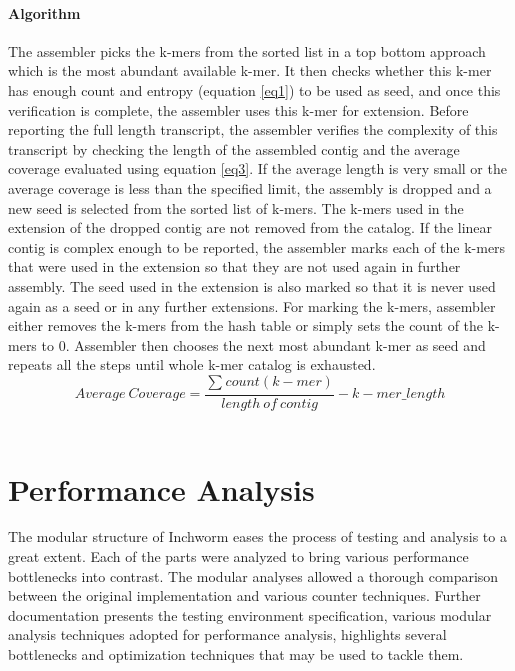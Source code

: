\label{key}\documentclass[plainarticle, english ,zihtitle,final,hyperref,utf8]{zihpub}
\begin{document}
\paragraph{Algorithm} The assembler picks the k-mers from the sorted list in a top bottom approach which is the most abundant available k-mer. It then checks whether this k-mer has enough count and entropy (equation \ref{eq1}) to be used as seed, and once this verification is complete, the assembler uses this k-mer for extension. Before reporting the full length transcript, the assembler verifies the complexity of this transcript by checking the length of the assembled contig and the average coverage evaluated using equation \ref{eq3}. If the average length is very small or the average coverage is less than the specified limit, the assembly is dropped and a new seed is selected from the sorted list of k-mers. The k-mers used in the extension of the dropped contig are not removed from the catalog. If the linear contig is complex enough to be reported, the assembler marks each of the k-mers that were used in the extension so that they are not used again in further assembly. The seed used in the extension is also marked so that it is never used again as a seed or in any further extensions. For marking the k-mers, assembler either removes the k-mers from the hash table or simply sets the count of the k-mers to 0. Assembler then chooses the next most abundant k-mer as seed and repeats all the steps until whole k-mer catalog is exhausted.
\begin{equation}
Average\ Coverage = \frac{\sum_{} count (k-mer)}{length\ of\ contig} - k-mer\_length
\label{eq3}
\end{equation}
\\
\section{Performance Analysis}
The modular structure of Inchworm eases the process of testing and analysis to a great extent. Each of the parts were analyzed to bring various performance bottlenecks into contrast. The modular analyses allowed a thorough comparison between the original implementation and various counter techniques. Further documentation presents the testing environment specification, various modular analysis techniques adopted for performance analysis, highlights several bottlenecks and optimization techniques that may be used to tackle them. 
\end{document}
